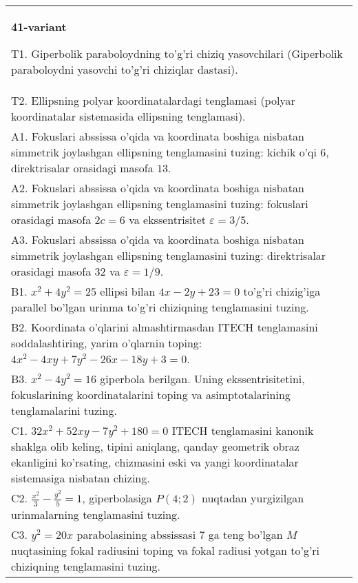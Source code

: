 \documentclass{article}
\begin{document}
\begin{tabular}{m{17cm}}
\textbf{41-variant}
\newline

T1. Giperbolik paraboloydning to'g'ri chiziq yasovchilari (Giperbolik paraboloydni yasovchi to'g'ri chiziqlar dastasi).\\

T2. Ellipsning polyar koordinatalardagi tenglamasi (polyar koordinatalar sistemasida ellipsning tenglamasi).\\

A1. Fokuslari abssissa o'qida va koordinata boshiga nisbatan simmetrik joylashgan ellipsning tenglamasini tuzing: kichik o'qi $6$, direktrisalar orasidagi masofa $13$.\\

A2. Fokuslari abssissa o'qida va koordinata boshiga nisbatan simmetrik joylashgan ellipsning tenglamasini tuzing: fokuslari orasidagi masofa $2c=6$ va ekssentrisitet $\varepsilon=3/5$.\\

A3. Fokuslari abssissa o'qida va koordinata boshiga nisbatan simmetrik joylashgan ellipsning tenglamasini tuzing: direktrisalar orasidagi masofa $32$ va $\varepsilon=1/9$.\\

B1. $x^{2} + 4y^{2} = 25$ ellipsi bilan $4x - 2y + 23 = 0$ to'g'ri chizig'iga parallel bo'lgan urinma to'g'ri chiziqning tenglamasini tuzing.  \\

B2. Koordinata o'qlarini almashtirmasdan ITECH tenglamasini soddalashtiring, yarim o'qlarnin toping: $4x^{2} - 4xy + 7y^{2} - 26x - 18y + 3 = 0$.\\

B3. $x^{2} - 4y^{2} = 16$ giperbola berilgan. Uning ekssentrisitetini, fokuslarining koordinatalarini toping va asimptotalarining tenglamalarini tuzing.\\

C1. $32x^{2} + 52xy - 7y^{2} + 180 = 0$ ITECH tenglamasini kanonik shaklga olib keling, tipini aniqlang, qanday geometrik obraz ekanligini ko'rsating, chizmasini eski va yangi koordinatalar sistemasiga nisbatan chizing.  \\

C2. $\frac{x^{2}}{3} - \frac{y^{2}}{5} = 1$, giperbolasiga $P(4;2)$ nuqtadan yurgizilgan urinmalarning tenglamasini tuzing.  \\

C3. $y^{2} = 20x$ parabolasining abssissasi 7 ga teng bo'lgan $M$ nuqtasining fokal radiusini toping va fokal radiusi yotgan to'g'ri chiziqning tenglamasini tuzing.  \\

\end{tabular}
\vspace{1cm}
\end{document}
